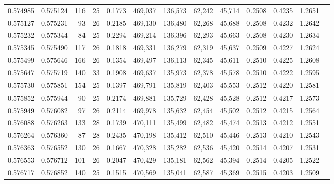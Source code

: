\begin{tabular}{rrrrrrrrrrrrr}
0.574985 & 0.575124 & 116 &  25 &                                     0.1773 & 469,037 & 136,573 &  62,242 &  45,714 & 0.2508 & 0.4235 & 1.2651 \\
0.575127 & 0.575231 &  93 &  26 &                                     0.2185 & 469,130 & 136,480 &  62,268 &  45,688 & 0.2508 & 0.4232 & 1.2642 \\
0.575232 & 0.575344 &  84 &  25 &                                     0.2294 & 469,214 & 136,396 &  62,293 &  45,663 & 0.2508 & 0.4230 & 1.2634 \\
0.575345 & 0.575490 & 117 &  26 &                                     0.1818 & 469,331 & 136,279 &  62,319 &  45,637 & 0.2509 & 0.4227 & 1.2624 \\
0.575499 & 0.575646 & 166 &  26 &                                     0.1354 & 469,497 & 136,113 &  62,345 &  45,611 & 0.2510 & 0.4225 & 1.2608 \\
0.575647 & 0.575719 & 140 &  33 &                                     0.1908 & 469,637 & 135,973 &  62,378 &  45,578 & 0.2510 & 0.4222 & 1.2595 \\
0.575730 & 0.575851 & 154 &  25 &                                     0.1397 & 469,791 & 135,819 &  62,403 &  45,553 & 0.2512 & 0.4220 & 1.2581 \\
0.575852 & 0.575944 &  90 &  25 &                                     0.2174 & 469,881 & 135,729 &  62,428 &  45,528 & 0.2512 & 0.4217 & 1.2573 \\
0.575949 & 0.576082 &  97 &  26 &                                     0.2114 & 469,978 & 135,632 &  62,454 &  45,502 & 0.2512 & 0.4215 & 1.2564 \\
0.576088 & 0.576263 & 133 &  28 &                                     0.1739 & 470,111 & 135,499 &  62,482 &  45,474 & 0.2513 & 0.4212 & 1.2551 \\
0.576264 & 0.576360 &  87 &  28 &                                     0.2435 & 470,198 & 135,412 &  62,510 &  45,446 & 0.2513 & 0.4210 & 1.2543 \\
0.576363 & 0.576552 & 130 &  26 &                                     0.1667 & 470,328 & 135,282 &  62,536 &  45,420 & 0.2514 & 0.4207 & 1.2531 \\
0.576553 & 0.576712 & 101 &  26 &                                     0.2047 & 470,429 & 135,181 &  62,562 &  45,394 & 0.2514 & 0.4205 & 1.2522 \\
0.576717 & 0.576852 & 140 &  25 &                                     0.1515 & 470,569 & 135,041 &  62,587 &  45,369 & 0.2515 & 0.4203 & 1.2509 \\

\end{tabular}

